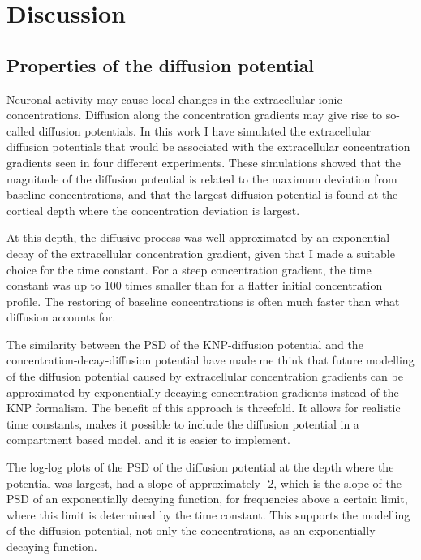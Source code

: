 \documentclass{article}
\begin{document}
\section{Discussion}


\subsection{Properties of the diffusion potential}
Neuronal activity may cause local changes in the extracellular ionic concentrations. Diffusion along the concentration gradients may give rise to so-called diffusion potentials. In this work I have simulated the extracellular diffusion potentials that would be associated with the extracellular concentration gradients seen in four different experiments. These simulations showed that the magnitude of the diffusion potential is related to the maximum deviation from baseline concentrations, and that the largest diffusion potential is found at the cortical depth where the concentration deviation is largest. 

At this depth, the diffusive process was well approximated by an exponential decay of the extracellular concentration gradient, given that I made a suitable choice for the time constant. For a steep concentration gradient, the time constant was up to 100 times smaller than for a flatter initial concentration profile. The restoring of baseline concentrations is often much faster than what diffusion accounts for. 

The similarity between the PSD of the KNP-diffusion potential and the concentration-decay-diffusion potential have made me think that future modelling of the diffusion potential caused by extracellular concentration gradients can be approximated by exponentially decaying concentration gradients instead of the KNP formalism. The benefit of this approach is threefold. It allows for realistic time constants, makes it possible to include the diffusion potential in a compartment based model, and it is easier to implement.


The log-log plots of the PSD of the diffusion potential at the depth where the potential was largest, had a slope of approximately -2, which is the slope of the PSD of an exponentially decaying function, for frequencies above a certain limit, where this limit is determined by the time constant. This supports the modelling of the diffusion potential, not only the concentrations, as an exponentially decaying function. 
\end{document}
